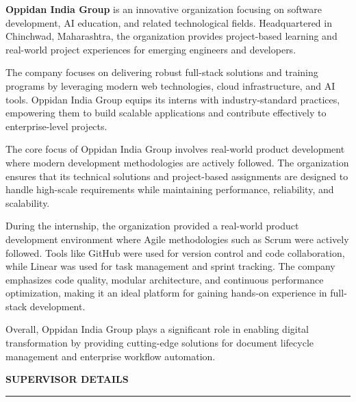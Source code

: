 \documentclass[12pt,a4paper]{article}
\begin{document}
\textbf{Oppidan India Group} is an innovative organization focusing on software development, AI education, and related technological fields. Headquartered in Chinchwad, Maharashtra, the organization provides project-based learning and real-world project experiences for emerging engineers and developers.

The company focuses on delivering robust full-stack solutions and training programs by leveraging modern web technologies, cloud infrastructure, and AI tools. Oppidan India Group equips its interns with industry-standard practices, empowering them to build scalable applications and contribute effectively to enterprise-level projects.

The core focus of Oppidan India Group involves real-world product development where modern development methodologies are actively followed. The organization ensures that its technical solutions and project-based assignments are designed to handle high-scale requirements while maintaining performance, reliability, and scalability.

During the internship, the organization provided a real-world product development environment where Agile methodologies such as Scrum were actively followed. Tools like GitHub were used for version control and code collaboration, while Linear was used for task management and sprint tracking. The company emphasizes code quality, modular architecture, and continuous performance optimization, making it an ideal platform for gaining hands-on experience in full-stack development.

Overall, Oppidan India Group plays a significant role in enabling digital transformation by providing cutting-edge solutions for document lifecycle management and enterprise workflow automation.

\vspace{0.4in}
\begin{center}
{\large\textbf{SUPERVISOR DETAILS}}\\
\vspace{0.1in}
\noindent\rule{\textwidth}{0.4pt}
\end{center}
\end{document}
